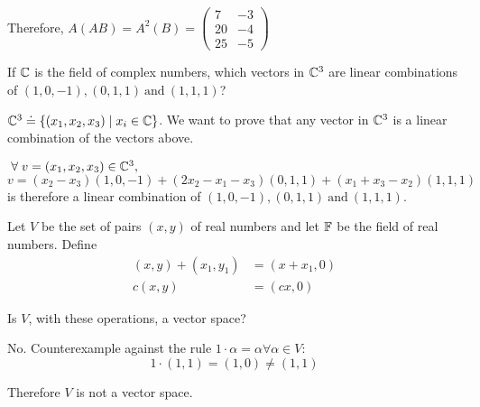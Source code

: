 \documentclass[a4paper, 10pt]{article}
\begin{document}
\begin{solution}
    Therefore, \(A(AB) = A^2(B) = \begin{pmatrix}
            7  & -3 \\
            20 & -4 \\
            25 & -5
        \end{pmatrix}\)
\end{solution}
\begin{problem} 
If \(\mathbb{C}\) is the field of complex numbers, which vectors in \(\mathbb{C}^3\) are linear combinations of \((1, 0, -1), (0, 1, 1) \:\text{and}\: (1, 1, 1)\)?
\end{problem}
\begin{solution}
    \(\mathbb{C}^3 \doteq \{(x_1, x_2, x_3) \mid x_i \in \mathbb{C}\}\). We want to prove that any vector in \(\mathbb{C}^3\) is a linear combination of the vectors above.

    \(\forall v = (x_1, x_2, x_3) \in \bbc^3, \)
    \[
        v = (x_2-x_3)(1, 0, -1) + (2x_2 - x_1 - x_3)(0, 1, 1) + (x_1+x_3-x_2)(1,1,1)
    \]
    is therefore a linear combination of \((1, 0, -1), (0, 1, 1) \:\text{and}\: (1, 1, 1)\).
\end{solution}
\begin{problem} 
Let \(V\) be the set of pairs \((x, y)\) of real numbers and let \(\mathbb{F}\) be the field of real numbers. Define
\begin{align*}
    (x, y) + (x_1, y_1) & = (x+x_1, 0) \\
    c(x, y)             & = (cx, 0)
\end{align*}

Is \(V\), with these operations, a vector space?
\end{problem}
\begin{solution}
    No. Counterexample against the rule \(1 \cdot \alpha = \alpha \forall \alpha \in V\):
    \[
        1\cdot(1,1) = (1, 0) \neq (1, 1)
    \]

    Therefore \(V\) is not a vector space.
\end{solution}
\end{document}
